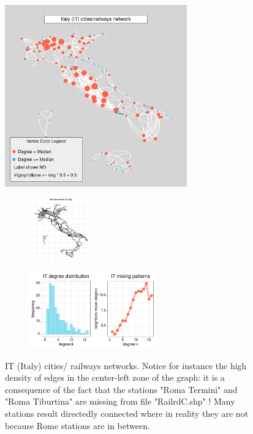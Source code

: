 \begin{figure}[H]
\centering
    \includegraphics[width = 0.7\textwidth]{latex_source/images/railways/city_networks/IT_network.pdf}
\begin{subfigure}{}
    \includegraphics[width = 0.3\textwidth]{latex_source/images/railways/raw_networks/raw_IT_network.pdf}
\end{subfigure}
\begin{subfigure}{}
    \includegraphics[width = 0.6\textwidth]{latex_source/images/railways/city_network_analysis/IT_analysis.pdf}
\end{subfigure}
\caption{IT (Italy) cities/ railways networks. Notice for instance the high density of edges in the center-left zone of the graph: it is a consequence of the fact that the stations "Roma Termini" and "Roma Tiburtina" are missing from file "RailrdC.shp" ! Many stations result directedly connected where in reality they are not because Rome stations are in between.}
\label{fig:rail_results}
\end{figure}
\newpage
